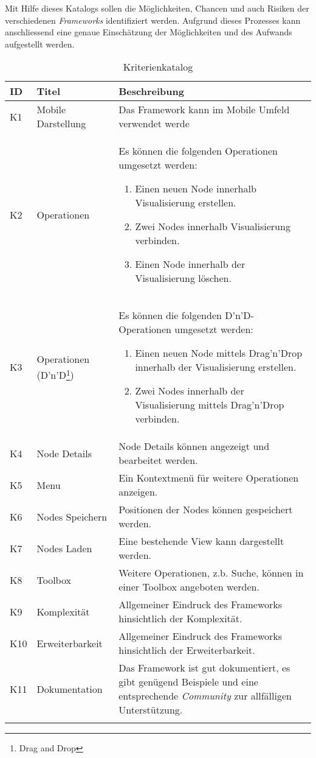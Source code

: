 Mit Hilfe dieses Katalogs sollen die Möglichkeiten, Chancen und auch Risiken der verschiedenen \textit{Frameworks} identifiziert werden. Aufgrund dieses Prozesses kann anschliessend eine genaue Einschätzung der Möglichkeiten und des Aufwands aufgestellt werden.

\begin{longtable}{|p{1cm}| p{3cm} | p{8.1cm}|}
  \hline
    ID & Titel &  Beschreibung \\\hline
    K1 & Mobile Darstellung & Das Framework kann im Mobile Umfeld verwendet werde\\\hline
    K2 & Operationen & Es können die folgenden Operationen umgesetzt werden:
        \begin{enumerate}
          \item Einen neuen Node innerhalb Visualisierung erstellen.
          \item Zwei Nodes innerhalb Visualisierung verbinden.
          \item Einen Node innerhalb der Visualisierung löschen.
        \end{enumerate} \\\hline
    K3 & Operationen (D'n'D\footnote{Drag and Drop}) & Es können die folgenden D'n'D-Operationen umgesetzt werden:
        \begin{enumerate}
          \item Einen neuen Node mittels Drag'n'Drop innerhalb der Visualisierung erstellen.
          \item Zwei Nodes innerhalb der Visualisierung mittels Drag'n'Drop verbinden.
        \end{enumerate} \\\hline
    K4 & Node Details & Node Details können angezeigt und bearbeitet werden.\\\hline
    K5 & Menu & Ein Kontextmenü für weitere Operationen anzeigen.\\\hline
    K6 & Nodes Speichern & Positionen der Nodes können gespeichert werden.\\\hline
    K7 & Nodes Laden & Eine bestehende View kann dargestellt werden.\\\hline
    K8 & Toolbox & Weitere Operationen, z.b. Suche, können in einer Toolbox angeboten werden.\\\hline
    K9 & Komplexität & Allgemeiner Eindruck des Frameworks hinsichtlich der Komplexität.\\\hline
    K10 & Erweiterbarkeit & Allgemeiner Eindruck des Frameworks hinsichtlich der Erweiterbarkeit.\\\hline
    K11 & Dokumentation & Das Framework ist gut dokumentiert, es gibt genügend Beispiele und eine entsprechende \textit{Community} zur allfälligen Unterstützung.\\\hline
    \caption{Kriterienkatalog}
  \label{tab:kriterien-katalog}
\end{longtable}
